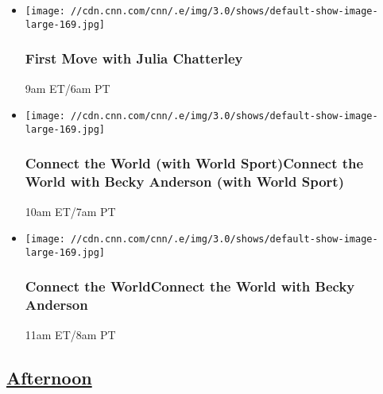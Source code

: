 \begin{itemize}
\item
  \texttt{[image: //cdn.cnn.com/cnn/.e/img/3.0/shows/default-show-image-large-169.jpg]}

  \hypertarget{first-move-with-julia-chatterley-1}{%
  \subsubsection{First Move with Julia
  Chatterley}\label{first-move-with-julia-chatterley-1}}

  9am ET/6am PT
\end{itemize}

\begin{itemize}
\item
  \texttt{[image: //cdn.cnn.com/cnn/.e/img/3.0/shows/default-show-image-large-169.jpg]}

  \hypertarget{connect-the-world-with-world-sportconnect-the-world-with-becky-anderson-with-world-sport--1}{%
  \subsubsection{Connect the World (with World Sport)Connect the World
  with Becky Anderson (with World Sport)
  }\label{connect-the-world-with-world-sportconnect-the-world-with-becky-anderson-with-world-sport--1}}

  10am ET/7am PT
\end{itemize}

\begin{itemize}
\item
  \texttt{[image: //cdn.cnn.com/cnn/.e/img/3.0/shows/default-show-image-large-169.jpg]}

  \hypertarget{connect-the-worldconnect-the-world-with-becky-anderson--3}{%
  \subsubsection{Connect the WorldConnect the World with Becky Anderson
  }\label{connect-the-worldconnect-the-world-with-becky-anderson--3}}

  11am ET/8am PT
\end{itemize}

\hypertarget{afternoon--3}{%
\subsection{\texorpdfstring{\href{/tv/schedule/cnn/index.html}{Afternoon}~}{Afternoon~}}\label{afternoon--3}}

